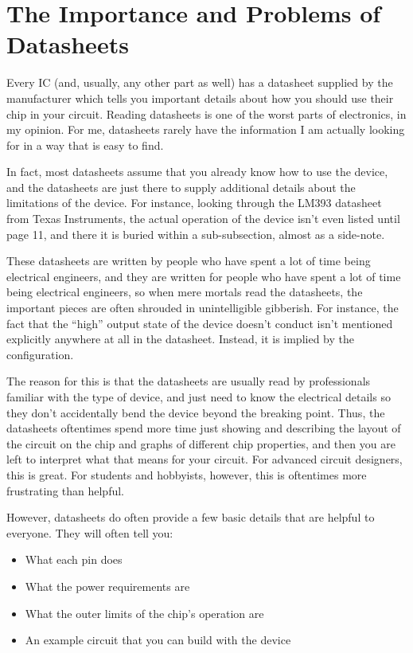 \section{The Importance and Problems of Datasheets}

Every IC (and, usually, any other part as well) has a datasheet supplied by the manufacturer which tells you important details about how you should use their chip in your circuit.
Reading datasheets is one of the worst parts of electronics, in my opinion. 
For me, datasheets rarely have the information I am actually looking for in a way that is easy to find.

In fact, most datasheets assume that you already know how to use the device, and the datasheets are just there to supply additional details about the limitations of the device.
For instance, looking through the LM393 datasheet from Texas Instruments, the actual operation of the device isn't even listed until page 11, and there it is buried within a sub-subsection, almost as a side-note.

These datasheets are written by people who have spent a lot of time being electrical engineers, and they are written for people who have spent a lot of time being electrical engineers, so when mere mortals read the datasheets, the important pieces are often shrouded in unintelligible gibberish.
For instance, the fact that the ``high'' output state of the device doesn't conduct isn't mentioned explicitly anywhere at all in the datasheet.  
Instead, it is implied by the configuration.

The reason for this is that the datasheets are usually read by professionals familiar with the type of device, and just need to know the electrical details so they don't accidentally bend the device beyond the breaking point.
Thus, the datasheets oftentimes spend more time just showing and describing the layout of the circuit on the chip and graphs of different chip properties, and then you are left to interpret what that means for your circuit.
For advanced circuit designers, this is great.
For students and hobbyists, however, this is oftentimes more frustrating than helpful.

However, datasheets do often provide a few basic details that are helpful to everyone.
They will often tell you:
\begin{itemize}
\item What each pin does
\item What the power requirements are
\item What the outer limits of the chip's operation are
\item An example circuit that you can build with the device
\end{itemize}

